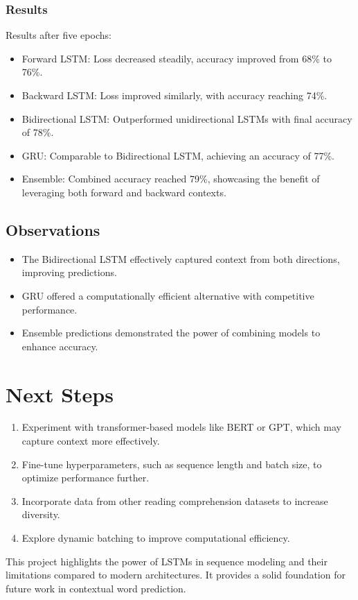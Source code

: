 \documentclass{article}
\begin{document}
\subsubsection{Results}
Results after five epochs:
\begin{itemize}
    \item Forward LSTM: Loss decreased steadily, accuracy improved from 68\% to 76\%.
    \item Backward LSTM: Loss improved similarly, with accuracy reaching 74\%.
    \item Bidirectional LSTM: Outperformed unidirectional LSTMs with final accuracy of 78\%.
    \item GRU: Comparable to Bidirectional LSTM, achieving an accuracy of 77\%.
    \item Ensemble: Combined accuracy reached 79\%, showcasing the benefit of leveraging both forward and backward contexts.
\end{itemize}

\subsection{Observations}
\begin{itemize}
    \item The Bidirectional LSTM effectively captured context from both directions, improving predictions.
    \item GRU offered a computationally efficient alternative with competitive performance.
    \item Ensemble predictions demonstrated the power of combining models to enhance accuracy.
\end{itemize}




\section{Next Steps}
\begin{enumerate}
    \item Experiment with transformer-based models like BERT or GPT, which may capture context more effectively.
    \item Fine-tune hyperparameters, such as sequence length and batch size, to optimize performance further.
    \item Incorporate data from other reading comprehension datasets to increase diversity.
    \item Explore dynamic batching to improve computational efficiency.
\end{enumerate}

This project highlights the power of LSTMs in sequence modeling and their limitations compared to modern architectures. It provides a solid foundation for future work in contextual word prediction.
\end{document}
